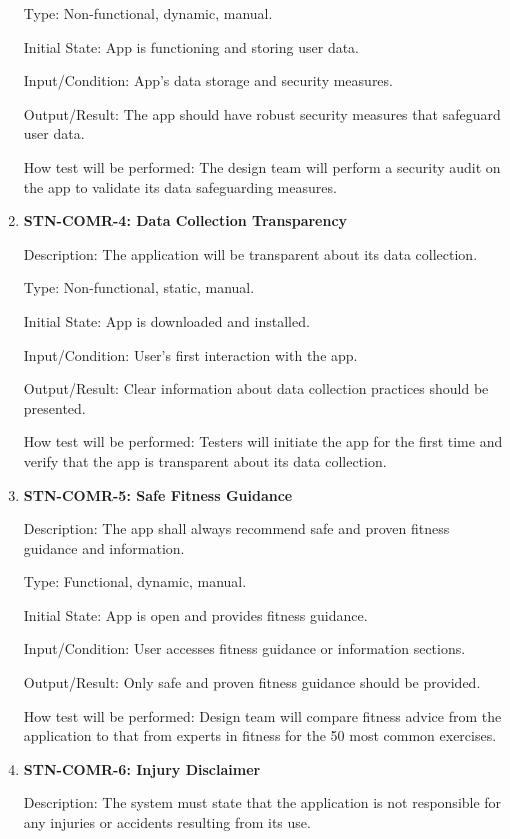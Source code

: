 \documentclass[12pt, titlepage]{article}
\begin{document}
\begin{enumerate}
        Type: Non-functional, dynamic, manual.

        Initial State: App is functioning and storing user data.

        Input/Condition: App's data storage and security measures.

        Output/Result: The app should have robust security measures that safeguard user data.

        How test will be performed: The design team will perform a security audit on the app to validate its data safeguarding measures.

        \item{\textbf{STN-COMR-4: Data Collection Transparency}}

        Description: The application will be transparent about its data collection.

        Type: Non-functional, static, manual.

        Initial State: App is downloaded and installed.

        Input/Condition: User's first interaction with the app.

        Output/Result: Clear information about data collection practices should be presented.

        How test will be performed: Testers will initiate the app for the first time and verify that the app is transparent about its data collection.

        \item{\textbf{STN-COMR-5: Safe Fitness Guidance}}

        Description: The app shall always recommend safe and proven fitness guidance and information.

        Type: Functional, dynamic, manual.

        Initial State: App is open and provides fitness guidance.

        Input/Condition: User accesses fitness guidance or information sections.

        Output/Result: Only safe and proven fitness guidance should be provided.

        How test will be performed: Design team will compare fitness advice from the application to that from experts in fitness for the 50 most common exercises.


        \item{\textbf{STN-COMR-6: Injury Disclaimer}}

        Description: The system must state that the application is not responsible for any injuries or accidents resulting from its use.


\end{enumerate}
\end{document}
